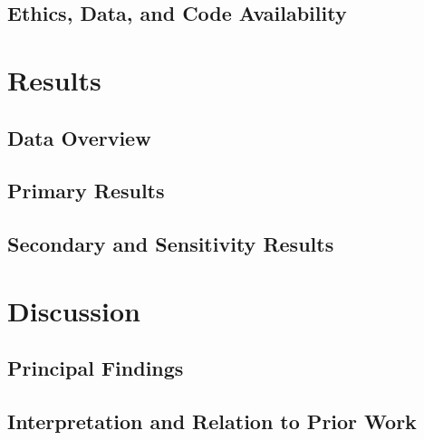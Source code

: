\subsection{Ethics, Data, and Code Availability}
\label{subsec:study1-reproducibility}
\mbox{}\par

\section{Results}
\label{sec:study1-results}

\subsection{Data Overview}
\mbox{}\par

\subsection{Primary Results}
\mbox{}\par

\subsection{Secondary and Sensitivity Results}
\mbox{}\par

\section{Discussion}
\label{sec:study1-discussion}

\subsection{Principal Findings}
\mbox{}\par

\subsection{Interpretation and Relation to Prior Work}
\mbox{}\par

